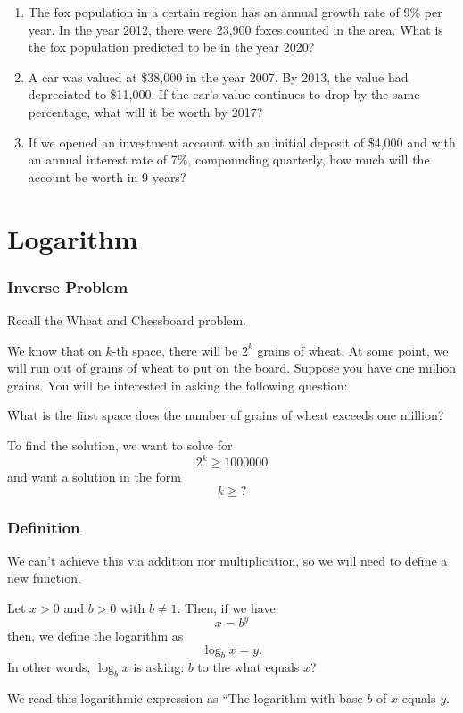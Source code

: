 \begin{frame}
  \begin{exercisebox}{}{}
    \begin{enumerate}
      \item The fox population in a certain region has an annual growth rate of 9\% per year. In the year 2012, there were 23,900 foxes counted in the area. What is the fox population predicted to be in the year 2020?
      \item A car was valued at \$38,000 in the year 2007. By 2013, the value had depreciated to \$11,000. If the car’s value continues to drop by the same percentage, what will it be worth by 2017?
      \item If we opened an investment account with an initial deposit of \$4,000 and with an annual interest rate of 7\%, compounding quarterly, how much will the account be worth in 9 years?
    \end{enumerate}
  \end{exercisebox}
\end{frame}

\section{Logarithm}
\frame{\sectionpage}

\begin{frame}[t]
  \frametitle{Inverse Problem}
  Recall the Wheat and Chessboard problem.
  \begin{slide}
    We know that on $k$-th space, there will be $2^k$ grains of wheat. At some point, we will run out of grains of wheat to put on the board. Suppose you have one million grains. You will be interested in asking the following question:

    \begin{question}{}
      What is the first space does the number of grains of wheat exceeds one million?
    \end{question}
    To find the solution, we want to solve for
    \[2^k \geq 1000000\]
    and want a solution in the form
    \[k \geq ?\]
  \end{slide}
\end{frame}

\begin{frame}
  \frametitle{Definition}
  We can't achieve this via addition nor multiplication, so we will need to define a new function.
  \begin{defn}{}{}
    Let $x > 0$ and $b > 0$ with $b \neq 1$. Then, if we have
    \[x = b^y\]
    then, we define the logarithm as
    \[ \log_b x = y.\]
    In other words, $\log_b x$ is asking: $b$ to the what equals $x$?

    We read this logarithmic expression as ``The logarithm with base $b$ of $x$ equals $y$.
  \end{defn} \pa
\end{frame}


